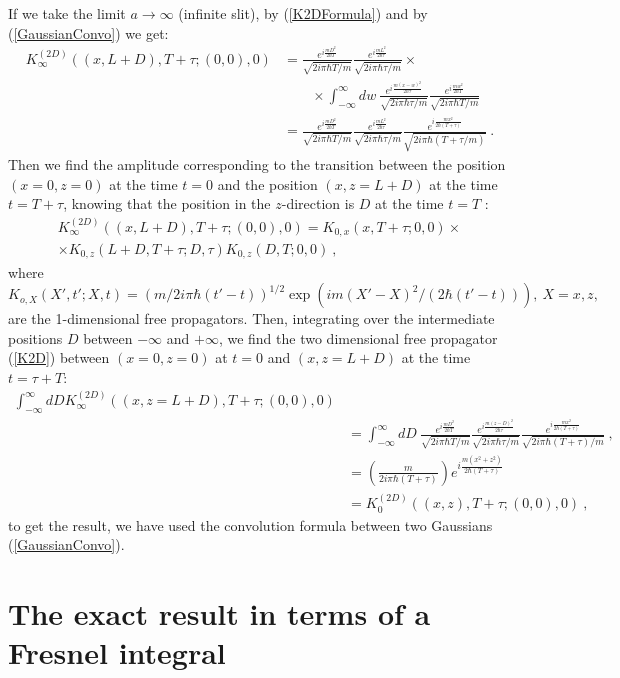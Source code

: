 \documentclass[12pt]{article}   %
\begin{document}
If we take the limit $a\rightarrow\infty$ (infinite slit), 
by (\ref{K2DFormula}) and by (\ref{GaussianConvo}) we get:
\begin{align*}
K_{\infty}^{(2D)}((x,L+D),T+\tau;(0,0),0)&=\frac{e^{i\frac{mD^2}{2\hbar T}}}{\sqrt{2i\pi\hbar T/m}} 
\frac{e^{i\frac{m L^2}{2\hbar\tau}}}{\sqrt{2i\pi\hbar\tau/m}}\times \\
& \qquad \times \int_{-\infty}^{\infty}dw\ \frac{e^{i\frac{m (x-w)^2}{2\hbar\tau}}}{\sqrt{2i\pi\hbar\tau/m}}
\frac{e^{i\frac{m w^2}{2\hbar T}}}{\sqrt{2i\pi\hbar T/m}}
{}\\{}&=\frac{e^{i\frac{mD^2}{2\hbar T}}}{\sqrt{2i\pi\hbar T/m}} 
\frac{e^{i\frac{m L^2}{2\hbar\tau}}}{\sqrt{2i\pi\hbar\tau/m}}
\frac{e^{i\frac{m x^2}{2\hbar (T+\tau)}}}{\sqrt{2i\pi\hbar (T+\tau/m)}}\ .
\end{align*}
Then we find the amplitude corresponding to the transition
between the position $(x=0,z=0)$ at the time $t=0$ 
and the position $(x,z=L+D)$ at the time $t=T+\tau$, 
knowing that the position in the $z$-direction is $D$ at the time $t=T$ :
\begin{multline*}
K_{\infty}^{(2D)}((x,L+D),T+\tau; (0,0),0) =K_{0,x}\left(x,T+\tau;0,0\right) \times \\ \times K_{0,z}\left(L+D,T+\tau;D,\tau\right)K_{0,z}\left(D,T;0,0\right)\ ,
\end{multline*}
where $K_{o,X}(X',t';X,t)=(m/2i\pi\hbar(t'-t))^{1/2}\exp{\left(im(X'-X)^2/(2\hbar(t'-t))\right)},\ X=x,z,$ 
are the 1-dimensional free propagators.
Then, integrating over the intermediate positions $D$ between $-\infty$ and $+\infty$,
we find the two dimensional free propagator (\ref{K2D}) between $(x=0,z=0)$ at $t=0$
and $(x,z=L+D)$ at the time $t=\tau+T$:
\begin{align*}
\int_{-\infty}^{\infty}dD {K_{\infty}^{(2D)}((x,z=L+D),T+\tau;(0,0),0)}&{}\\
&=\int_{-\infty}^{\infty}dD\ \frac{e^{i\frac{mD^2}{2\hbar T}}}{\sqrt{2i\pi\hbar T/m}} 
\frac{e^{i\frac{m (z-D)^2}{2\hbar\tau}}}{\sqrt{2i\pi\hbar\tau/m}}
\frac{e^{i\frac{m x^2}{2\hbar (T+\tau)}}}{\sqrt{2i\pi\hbar (T+\tau)/m}}\ ,
{}\\{}&=\left(\frac{m}{2i\pi\hbar (T+\tau)}\right)e^{i\frac{m (x^2+z^2)}{2\hbar (T+\tau)}}
{}\\{}&= K_0^{(2D)}((x,z),T+\tau;(0,0),0)\ ,
\end{align*} 
to get the result, we have used the convolution formula between two Gaussians (\ref{GaussianConvo}).

\section{The exact result in terms of a Fresnel integral}
\end{document}
